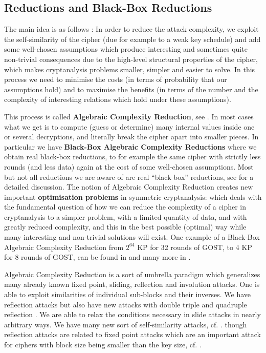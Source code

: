 \subsection{Reductions and Black-Box Reductions}


The main idea is as follows \cite{gostreport,gostac}:
In order to reduce the attack complexity,
we exploit the self-similarity of the cipher
(due for example to a weak key schedule)
and add some well-chosen assumptions which produce interesting
and sometimes quite non-trivial consequences
due to the high-level structural properties of the cipher,
which makes cryptanalysis problems
smaller, simpler and easier to solve.
In this process we need to minimise the costs
(in terms of probability that our assumptions hold)
and to maximise the benefits
(in terms of the number and the complexity of interesting relations
which hold under these assumptions).

This process is called
{\bf Algebraic Complexity Reduction},
see \cite{gostreport,gostac}.
In most cases what we get is to compute (guess or determine)
many internal values inside one or several decryptions,
and literally break the cipher apart into smaller pieces.
In particular we have
{\bf Black-Box Algebraic Complexity Reductions}
where we obtain real black-box reductions,
to for example the same cipher with strictly less rounds
(and less data)
again at the cost of some well-chosen assumptions.
Most but not all reductions we are aware of
are real ``black box'' reductions, see \cite{gostac}
for a detailed discussion.
The
notion of
Algebraic Complexity Reduction
creates
new important {\bf optimisation problems}
in symmetric cryptanalysis:
which deals with the fundamental question
of how we can reduce the complexity
of a cipher in cryptanalysis
to a simpler problem,
with a limited quantity of data,
and with greatly reduced complexity,
and this in the best possible (optimal)
way while many interesting and non-trivial
solutions will exist.
One example of a
Black-Box Algebraic Complexity Reduction
from $2^{64}$ KP for 32 rounds of GOST,
to 4 KP for 8 rounds of GOST, can be found in \cite{gostreport}
and many more in \cite{gostac}.

Algebraic Complexity Reduction is a sort of umbrella paradigm
which generalizes many already known
fixed point, sliding, reflection and involution attacks.
One is able to exploit similarities
of individual sub-blocks and their inverses.
We have reflection attacks \cite{GOSTReflectionKara}
but also have new attacks
with double triple and quadruple reflection \cite{gostac}.
We are able to relax the conditions
necessary in slide attacks
\cite{slide2} in nearly arbitrary ways.
We have many new sort of self-similarity attacks, cf. \cite{gostac}.
though reflection attacks \cite{GOSTReflectionKara,gostac}
are related to fixed point attacks which are
an important attack for ciphers
with block size being smaller than the key size, cf.
\cite{courtois2008algebraicKeeLoq,KeeLoqTatra}.




